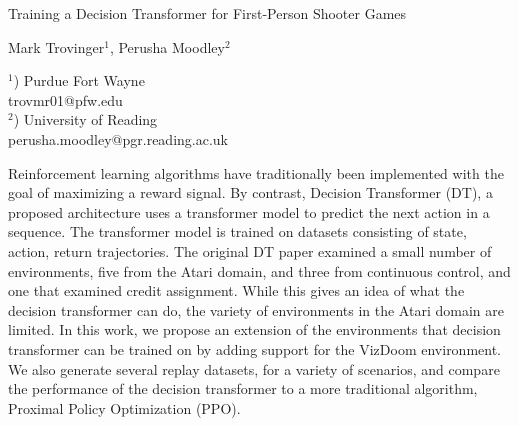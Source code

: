 \documentclass[a4paper]{article}
\begin{document}

\Large
 \begin{center}
Training a Decision Transformer for First-Person Shooter Games\\ 

\hspace{10pt}

\large
Mark Trovinger$^1$, Perusha Moodley$^2$ \\

\hspace{10pt}

\small  
$^1$) Purdue Fort Wayne\\
trovmr01@pfw.edu\\
$^2$) University of Reading\\
perusha.moodley@pgr.reading.ac.uk\\

\end{center}

\hspace{10pt}

\normalsize

Reinforcement learning algorithms have traditionally been implemented with the goal of maximizing a reward signal. By contrast, Decision Transformer (DT), a proposed architecture uses a transformer model to predict the next action in a sequence. The transformer model is trained on datasets consisting of state, action, return trajectories. The original DT paper examined a small number of environments, five from the Atari domain, and three from continuous control, and one that examined credit assignment. While this gives an idea of what the decision transformer can do, the variety of environments in the Atari domain are limited. In this work, we propose an extension of the environments that decision transformer can be trained on by adding support for the VizDoom environment. We also generate several replay datasets, for a variety of scenarios, and compare the performance of the decision transformer to a more traditional algorithm, Proximal Policy Optimization (PPO). 
\end{document}
